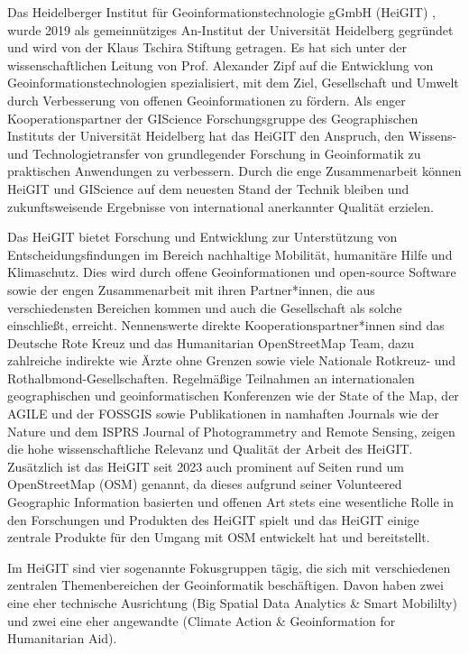 \documentclass[11pt]{article}
\begin{document}
Das Heidelberger Institut für Geoinformationstechnologie gGmbH (HeiGIT) \autocite{HeiGIT2024}, wurde 2019 als gemeinnütziges An-Institut der Universität Heidelberg gegründet und wird von der Klaus Tschira Stiftung getragen. Es hat sich unter der wissenschaftlichen Leitung von Prof. Alexander Zipf auf die Entwicklung von Geoinformationstechnologien spezialisiert, mit dem Ziel, Gesellschaft und Umwelt durch Verbesserung von offenen Geoinformationen zu fördern. Als enger Kooperationspartner der GIScience Forschungsgruppe des Geographischen Instituts der Universität Heidelberg hat das HeiGIT den Anspruch, den Wissens- und Technologietransfer von grundlegender Forschung in Geoinformatik zu praktischen Anwendungen zu verbessern. Durch die enge Zusammenarbeit können HeiGIT und GIScience auf dem neuesten Stand der Technik bleiben und zukunftsweisende Ergebnisse von international anerkannter Qualität erzielen.

Das HeiGIT bietet Forschung und Entwicklung zur Unterstützung von Entscheidungsfindungen im Bereich nachhaltige Mobilität, humanitäre Hilfe und Klimaschutz. Dies wird durch offene Geoinformationen und open-source Software sowie der engen Zusammenarbeit mit ihren Partner*innen, die aus verschiedensten Bereichen kommen und auch die Gesellschaft als solche einschließt, erreicht. Nennenswerte direkte Kooperationspartner*innen sind das Deutsche Rote Kreuz und das Humanitarian OpenStreetMap Team, dazu zahlreiche indirekte wie Ärzte ohne Grenzen sowie viele Nationale Rotkreuz- und Rothalbmond-Gesellschaften. Regelmäßige Teilnahmen an internationalen geographischen und geoinformatischen Konferenzen wie der State of the Map, der AGILE und der FOSSGIS sowie Publikationen in namhaften Journals wie der Nature und dem ISPRS Journal of Photogrammetry and Remote Sensing, zeigen die hohe wissenschaftliche Relevanz und Qualität der Arbeit des HeiGIT. Zusätzlich ist das HeiGIT seit 2023 auch prominent auf Seiten rund um OpenStreetMap (OSM) genannt, da dieses aufgrund seiner Volunteered Geographic Information basierten und offenen Art stets eine wesentliche Rolle in den Forschungen und Produkten des HeiGIT spielt und das HeiGIT einige zentrale Produkte für den Umgang mit OSM entwickelt hat und bereitstellt.

Im HeiGIT sind vier sogenannte Fokusgruppen tägig, die sich mit verschiedenen zentralen Themenbereichen der Geoinformatik beschäftigen. Davon haben zwei eine eher technische Ausrichtung (Big Spatial Data Analytics \& Smart Mobililty) und zwei eine eher angewandte (Climate Action \& Geoinformation for Humanitarian Aid). 
\end{document}

